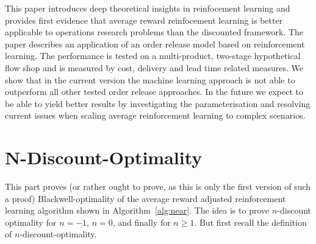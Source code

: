 \documentclass[envcountsame]{llncs}
\begin{document}
This paper introduces deep theoretical insights in reinfocement learning and provides first evidence
that average reward reinfocement learning is better applicable to operations research problems than
the discounted framework.
The paper describes an %
application of an order release model based on reinforcement learning. The performance is tested on
a multi-product, two-stage hypothetical flow shop and is measured by cost, delivery and lead time
related measures. We show that in the current version the machine learning approach is not able to
outperform all other tested order release
approaches. %
In the future we expect to be able to yield better results by investigating the parameterisation and
resolving current issues when scaling average reinforcement learning to complex scenarios.





\vfill
\pagebreak
\appendix


\section{N-Discount-Optimality}
\label{sec:methods}

This part proves (or rather ought to prove, as this is only the first version of such a proof)
Blackwell-optimality of the average reward adjusted reinforcement learning algorithm shown in
Algorithm~\ref{alg:near}. The idea is to prove \(n\)-discount optimality for \(n=-1\), \(n=0\), and
finally for \(n \geqslant 1\). But first recall the definition of \(n\)-discount-optimality.
\end{document}
